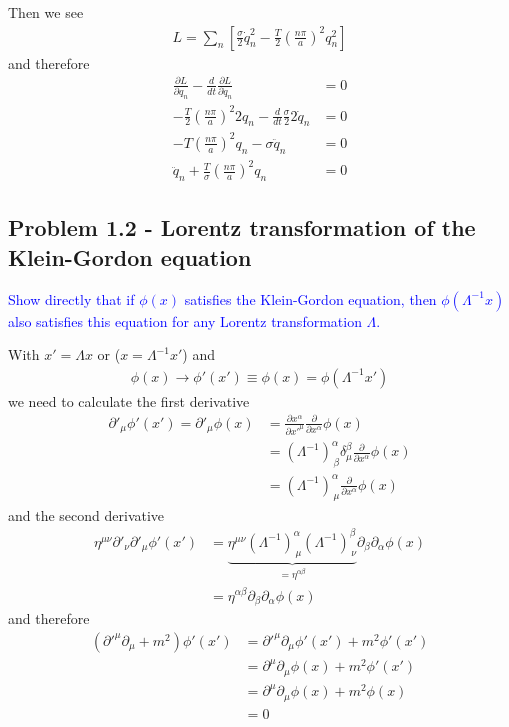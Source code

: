 \documentclass[../main.tex]{subfiles}
\begin{document}
Then we see
\begin{align}
L=\sum_{n}\left[\frac{\sigma}{2}\dot{q}_n^2-\frac{T}{2}\left(\frac{n\pi}{a}\right)^2q_n^2\right]
\end{align}
and therefore
\begin{align}
\frac{\partial L}{\partial q_n}-\frac{d}{dt}\frac{\partial L}{\partial \dot{q}_n}&=0\\
-\frac{T}{2}\left(\frac{n\pi}{a}\right)^2 2q_n-\frac{d}{dt}\frac{\sigma}{2}2\dot{q}_n&=0\\
-T\left(\frac{n\pi}{a}\right)^2 q_n-\sigma\ddot{q}_n&=0\\
\ddot{q}_n+\frac{T}{\sigma}\left(\frac{n\pi}{a}\right)^2q_n&=0
\end{align}

\subsection{Problem 1.2 - Lorentz transformation of the Klein-Gordon equation}
\textcolor{blue}{Show directly that if $\phi(x)$ satisfies the Klein-Gordon equation, then $\phi(\Lambda^{-1}x)$  also satisfies this equation for any Lorentz transformation $\Lambda$.}\newline


With $x'=\Lambda x$ or ($x=\Lambda^{-1}x'$) and
\begin{align}
\phi(x)\rightarrow\phi'(x')\equiv\phi(x)=\phi(\Lambda^{-1}x')
\end{align}
we need to calculate the first derivative
\begin{align}
\partial'_\mu\phi'(x')
=\partial'_\mu\phi(x)
&=\frac{\partial x^\alpha}{\partial x'^\mu}\frac{\partial}{\partial x^\alpha}\phi(x)\\
&=(\Lambda^{-1})^\alpha_{\,\beta}\delta^\beta_\mu\frac{\partial}{\partial x^\alpha}\phi(x)\\
&=(\Lambda^{-1})^\alpha_{\,\mu}\frac{\partial}{\partial x^\alpha}\phi(x)
\end{align}
and the second derivative
\begin{align}
\eta^{\mu\nu}\partial'_\nu\partial'_\mu\phi'(x')
&=\underbrace{\eta^{\mu\nu}(\Lambda^{-1})^\alpha_{\,\mu}(\Lambda^{-1})^\beta_{\,\nu}}_{=\eta^{\alpha\beta}}\partial_\beta\partial_\alpha\phi(x)\\
&=\eta^{\alpha\beta}\partial_\beta\partial_\alpha\phi(x)
\end{align}
and therefore
\begin{align}
(\partial'^\mu\partial_\mu+m^2)\phi'(x')
&=\partial'^\mu\partial_\mu\phi'(x')+m^2\phi'(x')\\
&=\partial^\mu\partial_\mu\phi(x)+m^2\phi'(x')\\
&=\partial^\mu\partial_\mu\phi(x)+m^2\phi(x)\\
&=0
\end{align}
\end{document}
